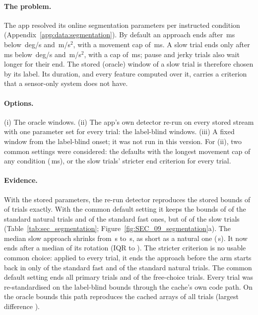 \paragraph{The problem.} The app resolved its online segmentation parameters per instructed condition
(Appendix~\ref{app:data:segmentation}). By default an approach ends after \,ms below
\,deg/s and \,m/s$^2$, with a movement cap of
\,ms. A slow trial ends only after \,ms below
\,deg/s and \,m/s$^2$, with a cap of
\,ms; pause and jerky trials also wait longer for their end. The stored (oracle)
window of a slow trial is therefore chosen by its label. Its duration, and every feature computed over it,
carries a criterion that a sensor-only system does not have.

\paragraph{Options.} (i) The oracle windows. (ii) The app's own detector re-run on every stored stream with one
parameter set for every trial: the label-blind windows. (iii) A fixed window from the label-blind onset; it was
not run in this version. For (ii), two common settings were considered: the defaults with the longest movement
cap of any condition (\,ms), or the slow trials' stricter end criterion for
every trial.

\paragraph{Evidence.} With the stored parameters, the re-run detector reproduces the stored bounds of
 of  trials exactly. With the common default setting it keeps the
bounds of  of the standard natural trials and
 of the standard fast ones, but of  of the
 slow trials (Table~\ref{tab:sec_segmentation}; Figure~\ref{fig:SEC_09_segmentation}a).
The median slow approach shrinks from \,s to \,s, as short as
a natural one (\,s). It now ends after a median  of
its rotation (IQR  to ). The
stricter criterion is no usable common choice: applied to every trial, it ends the approach before the arm starts
back in only  of the standard fast and  of the
standard natural trials. The common default setting ends all  primary trials and
 of the  free-choice trials. Every trial was re-standardised on the
label-blind bounds through the cache's own code path. On the oracle bounds this path reproduces the cached arrays
of all  trials (largest difference ).

